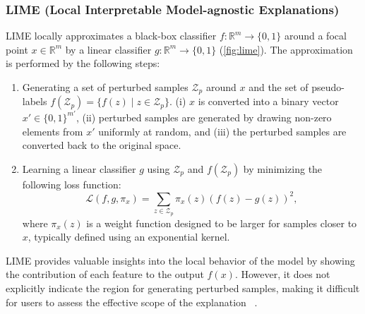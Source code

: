 \documentclass[runningheads]{llncs}
\begin{document}
\subsubsection[LIME]{%
  LIME (Local Interpretable Model-agnostic Explanations)~\cite{ribeiro2016why}
}
LIME locally
approximates a black-box classifier $f: \mathbb{R}^m \to \{0,1\}$
around a focal point $x \in \mathbb{R}^m$
by a linear classifier $g: \mathbb{R}^m \to \{0,1\}$
(\cref{fig:lime}).
The approximation is performed by the following steps:
\begin{enumerate}
  \item Generating a set of perturbed samples $\mathcal{Z}_p$ around $x$
        and the set of pseudo-labels $f(\mathcal{Z}_p) = \{f(z) \mid z \in \mathcal{Z}_p\}$.
        (i) $x$ is converted into a binary vector
        $x'\in{\{0,1\}}^{m'}$,
        (ii) perturbed samples are generated by drawing non-zero elements
        from $x'$ uniformly at random,
        and (iii) the perturbed samples are converted back to the original space.
  \item Learning a linear classifier $g$
        using $\mathcal{Z}_p$ and $f(\mathcal{Z}_p)$
        by minimizing the following loss function:
        \begin{equation}
          \mathcal{L}(f,g,\pi_x)=\sum_{z\in\mathcal{Z}_p}
          \pi_x(z){\left(f(z)-g(z)\right)}^2,
        \end{equation}
        where $\pi_x(z)$ is a weight function designed to be larger for samples
        closer to $x$, typically defined using an exponential kernel.
\end{enumerate}
LIME provides valuable insights into the local behavior of the model
by showing the contribution of each feature to the output $f(x)$.
However, it does not explicitly indicate the region for generating perturbed samples,
making it difficult for users to assess the effective scope of the explanation
~\cite{ribeiro2018anchors}.
\end{document}
